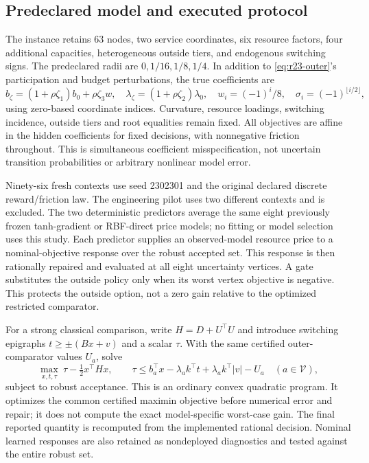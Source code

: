 \documentclass[11pt,letterpaper]{article}
\theoremstyle{definition}
\newcommand{\1}{\mathbf 1}
\begin{document}
\subsection{Predeclared model and executed protocol}
The instance retains 63 nodes, two service coordinates, six resource factors, four additional capacities, heterogeneous outside tiers, and endogenous switching signs. The predeclared radii are $0,1/16,1/8,1/4$. In addition to \eqref{eq:r23-outer}'s participation and budget perturbations, the true coefficients are
\[
 b_\zeta=(1+\rho\zeta_1)b_0+\rho\zeta_3w,\quad
 \lambda_\zeta=(1+\rho\zeta_2)\lambda_0,\quad
 w_i=(-1)^i/8,\quad \sigma_i=(-1)^{\lfloor i/2\rfloor},
\]
using zero-based coordinate indices. Curvature, resource loadings, switching incidence, outside tiers and root equalities remain fixed. All objectives are affine in the hidden coefficients for fixed decisions, with nonnegative friction throughout. This is simultaneous coefficient misspecification, not uncertain transition probabilities or arbitrary nonlinear model error.

Ninety-six fresh contexts use seed 2302301 and the original declared discrete reward/friction law. The engineering pilot uses two different contexts and is excluded. The two deterministic predictors average the same eight previously frozen tanh-gradient or RBF-direct price models; no fitting or model selection uses this study. Each predictor supplies an observed-model resource price to a nominal-objective response over the robust accepted set. This response is then rationally repaired and evaluated at all eight uncertainty vertices. A gate substitutes the outside policy only when its worst vertex objective is negative. This protects the outside option, not a zero gain relative to the optimized restricted comparator.

For a strong classical comparison, write $H=D+U^\top U$ and introduce switching epigraphs $t\geq\pm(Bx+v)$ and a scalar $\tau$. With the same certified outer-comparator values $U_a$, solve
\[
 \max_{x,t,\tau}\ \tau-\tfrac12x^\top Hx,\qquad
 \tau\leq b_a^\top x-\lambda_a k^\top t
       +\lambda_a k^\top|v|-U_a\quad(a\in\mathcal V),
\]
subject to robust acceptance. This is an ordinary convex quadratic program. It optimizes the common certified maximin objective before numerical error and repair; it does not compute the exact model-specific worst-case gain. The final reported quantity is recomputed from the implemented rational decision. Nominal learned responses are also retained as nondeployed diagnostics and tested against the entire robust set.
\end{document}

